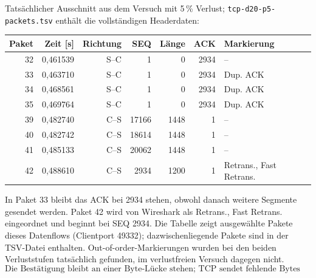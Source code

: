 \documentclass[a4paper,11pt]{article}
\newif\ifexplain
\newcommand{\explain}[1]{\ifexplain\begin{erklbox}#1\end{erklbox}\fi}
\begin{document}
Tatsächlicher Ausschnitt aus dem Versuch mit 5\,\% Verlust;
\texttt{tcp-d20-p5-packets.tsv} enthält die vollständigen Headerdaten:
\begin{center}\small\begin{tabular}{rrrrrrl}\toprule
Paket & Zeit [s] & Richtung & SEQ & Länge & ACK & Markierung\\\midrule
32 & 0,461539 & S--C & 1 & 0 & 2934 & --\\
33 & 0,463710 & S--C & 1 & 0 & 2934 & Dup. ACK\\
34 & 0,468561 & S--C & 1 & 0 & 2934 & Dup. ACK\\
35 & 0,469764 & S--C & 1 & 0 & 2934 & Dup. ACK\\
39 & 0,482740 & C--S & 17166 & 1448 & 1 & --\\
40 & 0,482742 & C--S & 18614 & 1448 & 1 & --\\
41 & 0,485133 & C--S & 20062 & 1448 & 1 & --\\
42 & 0,488610 & C--S & 2934 & 1200 & 1 & Retrans., Fast Retrans.\\
\bottomrule\end{tabular}\end{center}
In Paket 33 bleibt das ACK bei 2934 stehen, obwohl danach weitere Segmente gesendet werden. Paket 42 wird von Wireshark als Retrans., Fast Retrans. eingeordnet und beginnt bei SEQ 2934. Die Tabelle zeigt ausgewählte Pakete dieses Datenflows (Clientport 49332); dazwischenliegende Pakete sind in der TSV-Datei enthalten. Out-of-order-Markierungen wurden bei den beiden Verluststufen tatsächlich gefunden, im verlustfreien Versuch dagegen nicht.
\[\boxed{\text{Die Bestätigung bleibt an einer Byte-Lücke stehen; TCP sendet fehlende Bytes erneut.}}\]
\explain{Wenn ein Segment fehlt, können später gesendete Segmente trotzdem
ankommen. Der Empfänger bestätigt weiter das erste fehlende Byte. Das erzeugt
Duplicate ACKs. Genügend solche ACKs oder weitere Verlustsignale können eine
schnelle Wiederholung auslösen; sonst greift ein Wiederholungstimer.
Am Clientinterface sehen wir nur einen Ausschnitt des gesamten Pfads.
Die Platzierung des Mitschnitts relativ zu den lokalen Queueing-Disziplinen
beeinflusst, welche ausgehenden Segmente sichtbar sind.
Wir können den Verlustort damit nicht einem Link zuordnen.
Out-of-order ist eine Wireshark-Heuristik, kein Beweis für absichtlich
umgeordnete Links. Hier ist keine zusätzliche Reordering-Regel eingestellt.
Die iperf3-Retransmissions und Wireshark-Zähler sind verschiedene Messgrößen:
ein Senderzähler einerseits, aus einem Mitschnitt abgeleitete Markierungen andererseits.}
\end{document}

